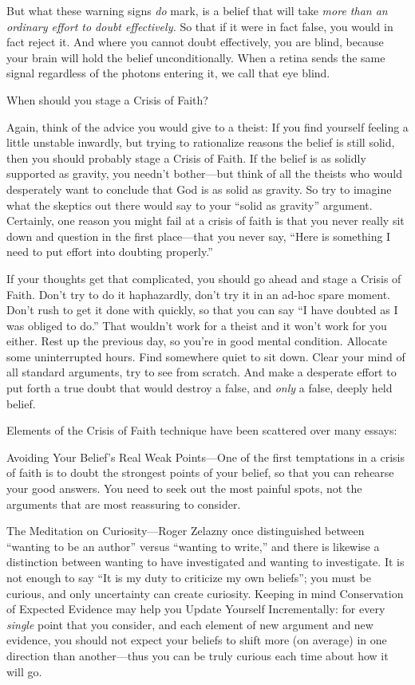 {
 But what these warning signs \textit{do} mark, is a belief that
will take \textit{more than an ordinary effort to doubt effectively.}
So that if it were in fact false, you would in fact reject it. And
where you cannot doubt effectively, you are blind, because your brain
will hold the belief unconditionally. When a retina sends the same
signal regardless of the photons entering it, we call that eye blind.}

{
 When should you stage a Crisis of Faith?}

{
 Again, think of the advice you would give to a theist: If you find
yourself feeling a little unstable inwardly, but trying to rationalize
reasons the belief is still solid, then you should probably stage a
Crisis of Faith. If the belief is as solidly supported as gravity, you
needn't bother---but think of all the theists who would
desperately want to conclude that God is as solid as gravity. So try to
imagine what the skeptics out there would say to your
``solid as gravity'' argument.
Certainly, one reason you might fail at a crisis of faith is that you
never really sit down and question in the first place---that you never
say, ``Here is something I need to put effort into
doubting properly.''}

{
 If your thoughts get that complicated, you should go ahead and
stage a Crisis of Faith. Don't try to do it
haphazardly, don't try it in an ad-hoc spare moment.
Don't rush to get it done with quickly, so that you can
say ``I have doubted as I was obliged to
do.'' That wouldn't work for a theist
and it won't work for you either. Rest up the previous
day, so you're in good mental condition. Allocate some
uninterrupted hours. Find somewhere quiet to sit down. Clear your mind
of all standard arguments, try to see from scratch. And make a
desperate effort to put forth a true doubt that would destroy a false,
and \textit{only} a false, deeply held belief.}

{
 Elements of the Crisis of Faith technique have been scattered over
many essays:}

{
 Avoiding Your Belief's Real Weak Points---One of
the first temptations in a crisis of faith is to doubt the strongest
points of your belief, so that you can rehearse your good answers. You
need to seek out the most painful spots, not the arguments that are
most reassuring to consider.}

{
 The Meditation on Curiosity---Roger Zelazny once distinguished
between ``wanting to be an author''
versus ``wanting to write,'' and
there is likewise a distinction between wanting to have investigated
and wanting to investigate. It is not enough to say
``It is my duty to criticize my own
beliefs''; you must be curious, and only uncertainty
can create curiosity. Keeping in mind Conservation of Expected Evidence
may help you Update Yourself Incrementally: for every \textit{single}
point that you consider, and each element of new argument and new
evidence, you should not expect your beliefs to shift more (on average)
in one direction than another---thus you can be truly curious each time
about how it will go.}

